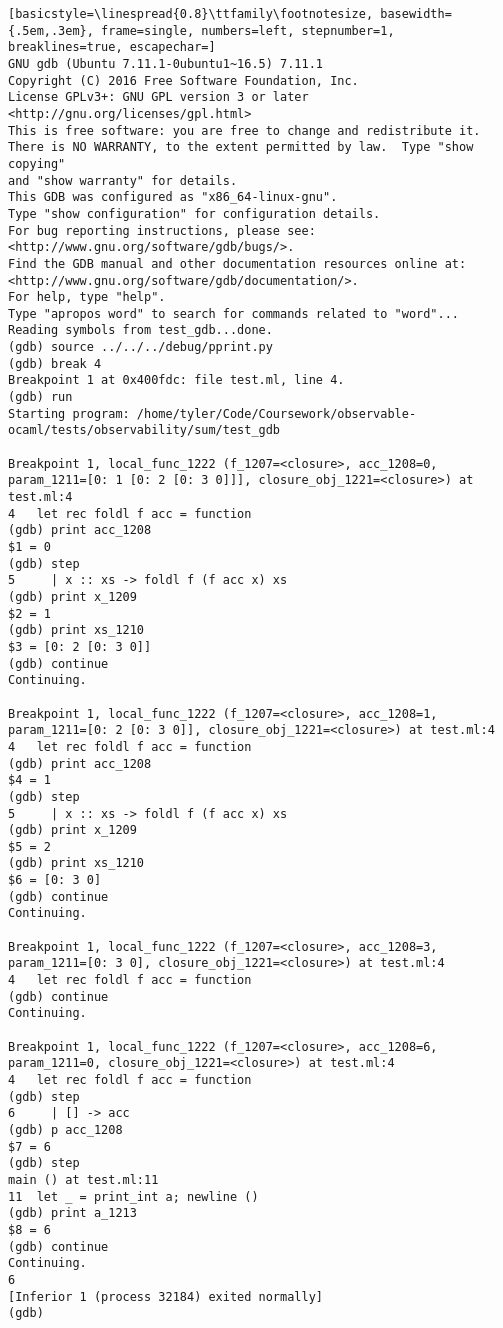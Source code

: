 \begin{lstlisting}[basicstyle=\linespread{0.8}\ttfamily\footnotesize, basewidth={.5em,.3em}, frame=single, numbers=left, stepnumber=1, breaklines=true, escapechar=]
GNU gdb (Ubuntu 7.11.1-0ubuntu1~16.5) 7.11.1
Copyright (C) 2016 Free Software Foundation, Inc.
License GPLv3+: GNU GPL version 3 or later <http://gnu.org/licenses/gpl.html>
This is free software: you are free to change and redistribute it.
There is NO WARRANTY, to the extent permitted by law.  Type "show copying"
and "show warranty" for details.
This GDB was configured as "x86_64-linux-gnu".
Type "show configuration" for configuration details.
For bug reporting instructions, please see:
<http://www.gnu.org/software/gdb/bugs/>.
Find the GDB manual and other documentation resources online at:
<http://www.gnu.org/software/gdb/documentation/>.
For help, type "help".
Type "apropos word" to search for commands related to "word"...
Reading symbols from test_gdb...done.
(gdb) source ../../../debug/pprint.py
(gdb) break 4
Breakpoint 1 at 0x400fdc: file test.ml, line 4.
(gdb) run
Starting program: /home/tyler/Code/Coursework/observable-ocaml/tests/observability/sum/test_gdb 

Breakpoint 1, local_func_1222 (f_1207=<closure>, acc_1208=0, param_1211=[0: 1 [0: 2 [0: 3 0]]], closure_obj_1221=<closure>) at test.ml:4
4	let rec foldl f acc = function
(gdb) print acc_1208
$1 = 0
(gdb) step
5	  | x :: xs -> foldl f (f acc x) xs
(gdb) print x_1209
$2 = 1
(gdb) print xs_1210
$3 = [0: 2 [0: 3 0]]
(gdb) continue
Continuing.

Breakpoint 1, local_func_1222 (f_1207=<closure>, acc_1208=1, param_1211=[0: 2 [0: 3 0]], closure_obj_1221=<closure>) at test.ml:4
4	let rec foldl f acc = function
(gdb) print acc_1208
$4 = 1
(gdb) step
5	  | x :: xs -> foldl f (f acc x) xs
(gdb) print x_1209
$5 = 2
(gdb) print xs_1210
$6 = [0: 3 0]
(gdb) continue
Continuing.

Breakpoint 1, local_func_1222 (f_1207=<closure>, acc_1208=3, param_1211=[0: 3 0], closure_obj_1221=<closure>) at test.ml:4
4	let rec foldl f acc = function
(gdb) continue
Continuing.

Breakpoint 1, local_func_1222 (f_1207=<closure>, acc_1208=6, param_1211=0, closure_obj_1221=<closure>) at test.ml:4
4	let rec foldl f acc = function
(gdb) step
6	  | [] -> acc
(gdb) p acc_1208
$7 = 6
(gdb) step
main () at test.ml:11
11	let _ = print_int a; newline ()
(gdb) print a_1213
$8 = 6
(gdb) continue
Continuing.
6
[Inferior 1 (process 32184) exited normally]
(gdb) 
\end{lstlisting}